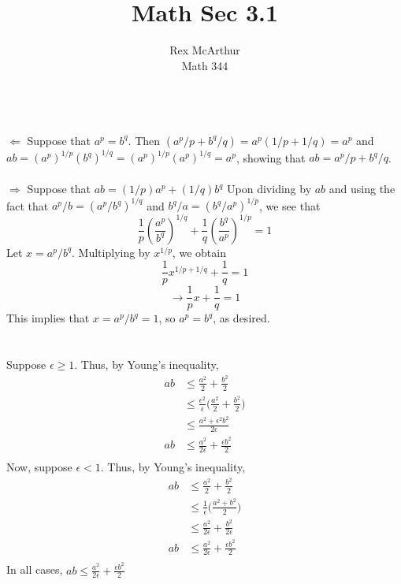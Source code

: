 \documentclass[letterpaper,12pt]{article}
\title{Math Sec 3.1}
\author{Rex McArthur\\Math 344}
\theoremstyle{definition}
\begin{document}
\maketitle
{}\\
$\Leftarrow$ Suppose that $a^{p} = b^{q}$. Then $(a^{p}/p+b^{q}/q)=a^{p}(1/p+1/q)=a^{p}$ and $ab = (a^{p})^{1/p}(b^{q})^{1/q}=(a^{p})^{1/p}(a^{p})^{1/q}=a^{p}$, showing that $ab = a^{p}/p+b^{q}/q$. \\ \\
$\Rightarrow$ Suppose that $ab=(1/p)a^{p}+(1/q)b^{q}$ Upon dividing by $ab$ and using the fact that $a^{p}/b=(a^{p}/b^{q})^{1/q}$ and $b^{q}/a=(b^{q}/a^{p})^{1/p}$, we see that \[ \frac{1}{p}(\frac{a^{p}}{b^{q}})^{1/q}+\frac{1}{q}(\frac{b^{q}}{a^{p}})^{1/p}=1\]
Let $x= a^{p}/b^{q}$. Multiplying by $x^{1/p}$, we obtain 
\[ \frac{1}{p}x^{1/p+1/q}+\frac{1}{q}=1\]
 \[\rightarrow \frac{1}{p}x+\frac{1}{q}=1\]
 This implies that $x= a^{p}/b^{q}=1$, so $a^{p}= b^{q}$, as desired.\\\\

\\
Suppose $\epsilon \geq 1$. Thus, by Young's inequality,
\begin{align*}
    ab & \leq \frac{a^2}{2} + \frac{b^2}{2} \\
    & \leq \frac{\epsilon ^2}{\epsilon}\big( \frac{a^2}{2} + \frac{b^2}{2} \big)\\
    & \leq  \frac{a^2 + \epsilon^2 b^2}{2\epsilon} \\
    ab & \leq \frac{a^2}{2\epsilon} + \frac{\epsilon b^2}{2} \\
\end{align*}
Now, suppose $\epsilon < 1$. Thus, by Young's inequality, 
\begin{align*}
    ab & \leq \frac{a^2}{2} + \frac{b^2}{2} \\
    & \leq \frac{1}{\epsilon}\big( \frac{a^2 + b^2}{2} \big)\\
    & \leq \frac{a^2}{2\epsilon} + \frac{b^2}{2\epsilon} \\
    ab & \leq \frac{a^2}{2\epsilon} + \frac{\epsilon b^2}{2} \\
\end{align*}
In all cases, $ab \leq \frac{a^2}{2\epsilon} + \frac{\epsilon b^2}{2}$\\
\end{document}
